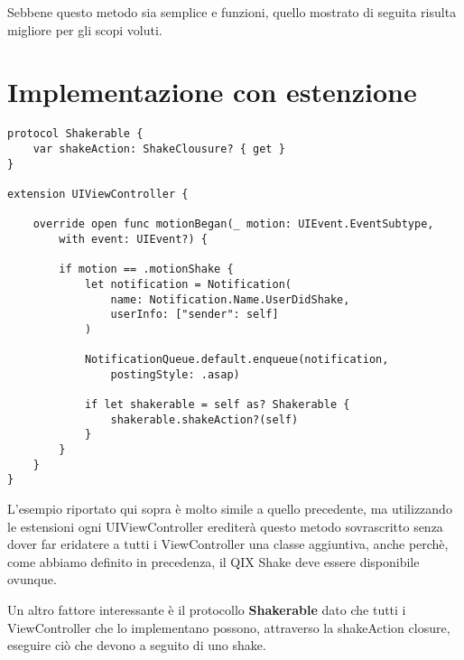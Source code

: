 Sebbene questo metodo sia semplice e funzioni, quello mostrato di seguita
risulta migliore per gli scopi voluti.

\section{Implementazione con estenzione}

\begin{verbatim}
protocol Shakerable {
    var shakeAction: ShakeClousure? { get }
}

extension UIViewController {
   
    override open func motionBegan(_ motion: UIEvent.EventSubtype,
        with event: UIEvent?) {

        if motion == .motionShake {
            let notification = Notification(
                name: Notification.Name.UserDidShake,
                userInfo: ["sender": self]
            )
            
            NotificationQueue.default.enqueue(notification,
                postingStyle: .asap)
            
            if let shakerable = self as? Shakerable {
                shakerable.shakeAction?(self)
            }
        }
    }
}
\end{verbatim}

L'esempio riportato qui sopra è molto simile a quello precedente, ma utilizzando le estensioni
ogni UIViewController erediterà questo metodo sovrascritto senza dover far eridatere a tutti i ViewController
una classe aggiuntiva, anche perchè, come abbiamo definito in precedenza, il QIX Shake deve essere disponibile
ovunque. 

Un altro fattore interessante è il protocollo \textbf{Shakerable} dato che tutti i ViewController che lo implementano
possono, attraverso la shakeAction closure, eseguire ciò che devono a seguito di uno shake.